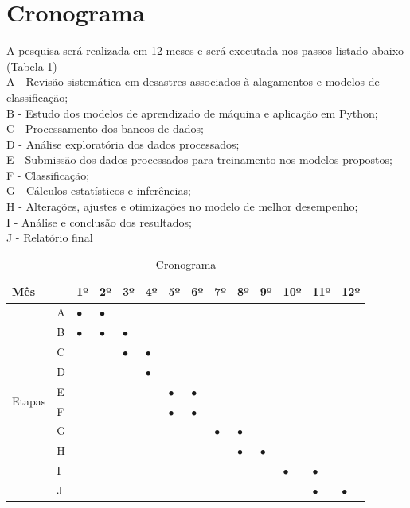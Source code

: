 \section{Cronograma}
A pesquisa será realizada em 12 meses e será executada nos passos listado abaixo (Tabela 1) \\ 
A - Revisão sistemática em desastres associados à alagamentos e modelos de classificação; \\
B - Estudo dos modelos de aprendizado de máquina e aplicação em Python; \\
C - Processamento dos bancos de dados; \\
D - Análise exploratória dos dados processados; \\
E - Submissão dos dados processados para treinamento nos modelos propostos; \\
F - Classificação; \\  
G - Cálculos estatísticos e inferências;\\
H - Alterações, ajustes e otimizações no modelo de melhor desempenho; \\
I - Análise e conclusão dos resultados; \\
J - Relatório final 
\begin{table}[H]
    \centering
    \begin{tabular}{|l|l|l|l|l|l|l|l|l|l|l|l|l|l|}
\hline
Mês &  & 1º & 2º & 3º & 4º & 5º & 6º & 7º & 8º & 9º & 10º & 11º & 12º \\ \hline
\multirow{10}{*}{\begin{turn}{90} Etapas \end{turn}} & A & $\bullet$ & $\bullet$ &  &  &  &  &  &  &  &  &  &  \\ \cline{2-14} 
 & B & $\bullet$ & $\bullet$ & $\bullet$ &  &  &  &  &  &  &  &  &  \\ \cline{2-14} 
 & C &  &  & $\bullet$ & $\bullet$ &  &  &  &  &  &  &  &  \\ \cline{2-14} 
 & D &  &  &  & $\bullet$ &  &  &  &  &  &  &  &  \\ \cline{2-14} 
 & E &  &  &  &  & $\bullet$ & $\bullet$ &  &  &  &  &  &  \\ \cline{2-14} 
 & F &  &  &  &  & $\bullet$ & $\bullet$ &  &  &  &  &  &  \\ \cline{2-14} 
 & G &  &  &  &  &  &  & $\bullet$ & $\bullet$ &  &  &  &  \\ \cline{2-14} 
 & H &  &  &  &  &  &  &  & $\bullet$ & $\bullet$ &  &  &  \\ \cline{2-14} 
 & I &  &  &  &  &  &  &  &  &  & $\bullet$ & $\bullet$ &  \\ \cline{2-14} 
 & J &  &  &  &  &  &  &  &  &  &  & $\bullet$ & $\bullet$ \\ \hline
\end{tabular}
    \caption{Cronograma}
    \label{tab:my_label}
\end{table}
